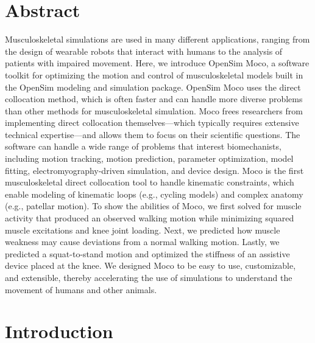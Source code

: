 \documentclass[10pt,letterpaper]{article}
\begin{document}
\section*{Abstract}
Musculoskeletal simulations are used in many different applications, ranging from the design of wearable robots that interact with humans to the analysis of patients with impaired movement. Here, we introduce OpenSim Moco, a software toolkit for optimizing the motion and control of musculoskeletal models built in the OpenSim modeling and simulation package. OpenSim Moco uses the direct collocation method, which is often faster and can handle more diverse problems than other methods for musculoskeletal simulation. Moco frees researchers from implementing direct collocation themselves---which typically requires extensive technical expertise---and allows them to focus on their scientific questions. The software can handle a wide range of problems that interest biomechanists, including motion tracking, motion prediction, parameter optimization, model fitting, electromyography-driven simulation, and device design. Moco is the first musculoskeletal direct collocation tool to handle kinematic constraints, which enable modeling of kinematic loops (e.g., cycling models) and complex anatomy (e.g., patellar motion). To show the abilities of Moco, we first solved for muscle activity that produced an observed walking motion while minimizing squared muscle excitations and knee joint loading. Next, we predicted how muscle weakness may cause deviations from a normal walking motion. Lastly, we predicted a squat-to-stand motion and optimized the stiffness of an assistive device placed at the knee. We designed Moco to be easy to use, customizable, and extensible, thereby accelerating the use of simulations to understand the movement of humans and other animals.



\linenumbers

\section*{Introduction}
\end{document}
